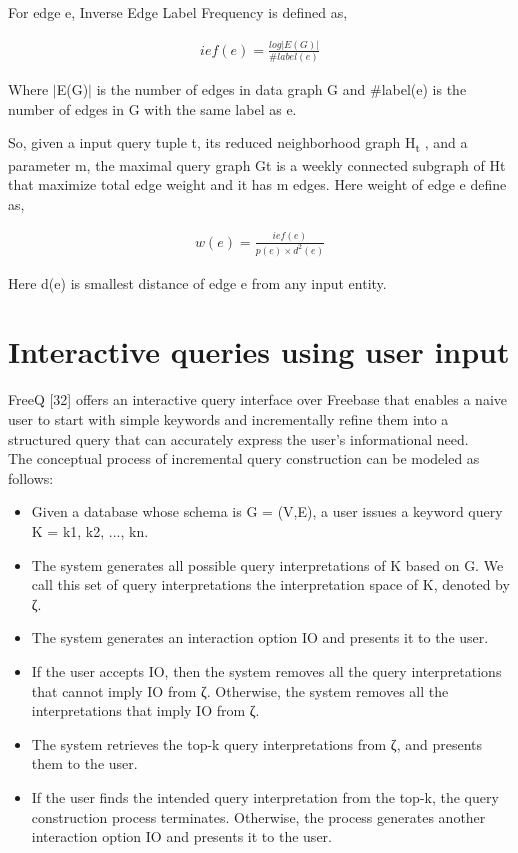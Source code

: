 For edge e, Inverse Edge Label Frequency is defined as,

\begin{align}
ief(e) = \frac{ log | E(G) | }{ \#label(e)}
\end{align}


Where $|$E(G)$|$ is the number of edges in data graph G and \#label(e) is the number of edges in G with the same label as e.

So, given a input query tuple t, its reduced neighborhood graph H\textsubscript{t}
, and a parameter m, the
maximal query graph Gt
 is a weekly connected subgraph of Ht
 that maximize total edge weight
and it has m edges. Here weight of edge e define as,

\begin{align}
w(e) = \frac{ief (e)}{p(e) \times d^2(e)}
\end{align}


Here d(e) is smallest distance of edge e from any input entity. 

 
\section{Interactive queries using user input}
 FreeQ [32] offers an interactive query interface over Freebase that enables a naive user to start with simple keywords and incrementally refine them into a structured query that can accurately express the user’s informational need. \\
 
The conceptual process of incremental query construction can be modeled as follows:
\begin{itemize}
\item 
Given a database whose schema is G = (V,E), a user
issues a keyword query K = {k1, k2, ..., kn}. 
\item The system generates all possible query interpretations of K based on G. We call this set of query interpretations the interpretation space of K, denoted by ζ. 
\item The system generates an interaction option IO and presents it to the user. 
\item If the user accepts IO, then the system removes all the query interpretations that cannot imply IO from ζ. Otherwise, the system removes all the interpretations that imply IO from ζ.
\item The system retrieves the top-k query interpretations
from ζ, and presents them to the user. 
\item If the user finds the intended query interpretation from the top-k, the query construction process terminates. Otherwise, the process generates another interaction option IO and
presents it to the user.
\end{itemize} 

